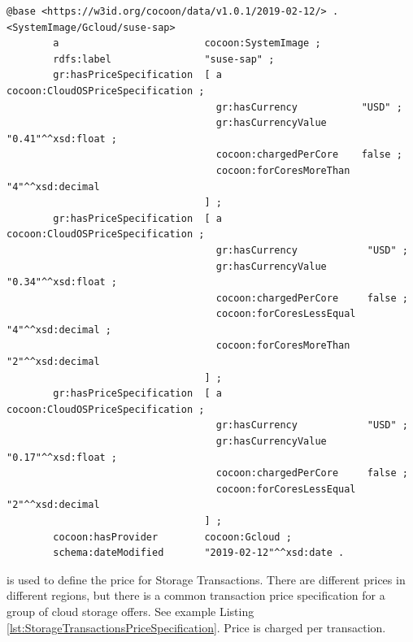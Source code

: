 \begin{lstlisting}[caption={OS Price Specification},label={lst:OSPriceSpecification}]
@base <https://w3id.org/cocoon/data/v1.0.1/2019-02-12/> .
<SystemImage/Gcloud/suse-sap>
        a                         cocoon:SystemImage ;
        rdfs:label                "suse-sap" ;
        gr:hasPriceSpecification  [ a                        cocoon:CloudOSPriceSpecification ;
                                    gr:hasCurrency           "USD" ;
                                    gr:hasCurrencyValue      "0.41"^^xsd:float ;
                                    cocoon:chargedPerCore    false ;
                                    cocoon:forCoresMoreThan  "4"^^xsd:decimal
                                  ] ;
        gr:hasPriceSpecification  [ a                         cocoon:CloudOSPriceSpecification ;
                                    gr:hasCurrency            "USD" ;
                                    gr:hasCurrencyValue       "0.34"^^xsd:float ;
                                    cocoon:chargedPerCore     false ;
                                    cocoon:forCoresLessEqual  "4"^^xsd:decimal ;
                                    cocoon:forCoresMoreThan   "2"^^xsd:decimal
                                  ] ;
        gr:hasPriceSpecification  [ a                         cocoon:CloudOSPriceSpecification ;
                                    gr:hasCurrency            "USD" ;
                                    gr:hasCurrencyValue       "0.17"^^xsd:float ;
                                    cocoon:chargedPerCore     false ;
                                    cocoon:forCoresLessEqual  "2"^^xsd:decimal
                                  ] ;
        cocoon:hasProvider        cocoon:Gcloud ;
        schema:dateModified       "2019-02-12"^^xsd:date .
\end{lstlisting}

\label{sec:StorageTransactionsPriceSpecification}
 is used to define the price for Storage Transactions. 
There are different prices in different regions,
but there is a common transaction price specification for a group of cloud storage offers.
See example Listing \ref{lst:StorageTransactionsPriceSpecification}.
Price is charged per transaction.

